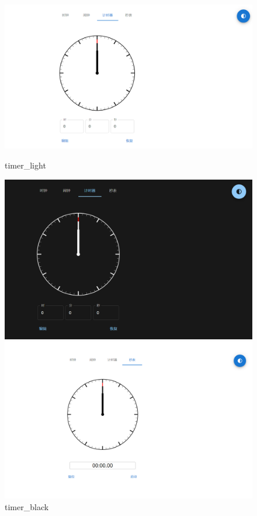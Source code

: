 \documentclass[a4paper,11pt]{article}
\begin{document}
\begin{figure}[!h]
    \begin{minipage}{0.48\textwidth}
        \centering
        \includegraphics[width=\linewidth]{image/timer.png}
        \caption{timer\_light}
    \end{minipage}\hfill
    \begin{minipage}{0.48\textwidth}
        \centering
        \includegraphics[width=\linewidth]{image/timer_black.png}
        \caption{timer\_black}
    \end{minipage}\hfill
    \begin{minipage}{0.48\textwidth}
        \centering
        \includegraphics[width=\linewidth]{image/stopwatch.png}

\end{minipage}
\end{figure}
\end{document}
